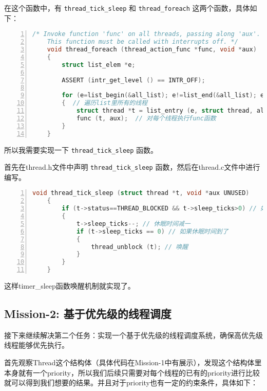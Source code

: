 \documentclass{article}
\begin{document}
	在这个函数中，有 \texttt{thread\_tick\_sleep} 和 \texttt{thread\_foreach} 这两个函数，具体如下：
	
	\begin{lstlisting}[xleftmargin = 4em,xrightmargin = 4em, aboveskip = 1em, numbers = left, language = C, title=\texttt{thread\_foreach()}函数]
    /* Invoke function 'func' on all threads, passing along 'aux'.
    This function must be called with interrupts off. */
    void thread_foreach (thread_action_func *func, void *aux)
    {
    	struct list_elem *e;
    	
    	ASSERT (intr_get_level () == INTR_OFF);
    	
    	for (e=list_begin(&all_list); e!=list_end(&all_list); e=list_next(e))
    	{  // 遍历list里所有的线程
            struct thread *t = list_entry (e, struct thread, allelem);
            func (t, aux);  // 对每个线程执行func函数
    	}
    }
	\end{lstlisting}
	
	所以我需要实现一下 \texttt{thread\_tick\_sleep} 函数。
	
	首先在thread.h文件中声明 \texttt{thread\_tick\_sleep} 函数，然后在thread.c文件中进行编写。
	
	\begin{lstlisting}[xleftmargin = 4em,xrightmargin = 4em, aboveskip = 1em, numbers = left, language = C, title=\texttt{thread\_tick\_sleep()}函数]
    void thread_tick_sleep (struct thread *t, void *aux UNUSED)
    {
    	if (t->status==THREAD_BLOCKED && t->sleep_ticks>0) // 如果休眠时间大于0
    	{
            t->sleep_ticks--; // 休眠时间减一
            if (t->sleep_ticks == 0) // 如果休眠时间到了
            {
                thread_unblock (t); // 唤醒
            }
    	}
    }
	\end{lstlisting}
	
	这样timer\_sleep函数唤醒机制就实现了。
	
	\subsection{Mission-2: 基于优先级的线程调度}
	
	接下来继续解决第二个任务：实现一个基于优先级的线程调度系统，确保高优先级线程能够优先执行。
	
	首先观察Thread这个结构体（具体代码在Mission-1中有展示），发现这个结构体里本身就有一个priority，所以我们后续只需要对每个线程的已有的priority进行比较就可以得到我们想要的结果。并且对于priority也有一定的约束条件，具体如下：
	
\end{document}
